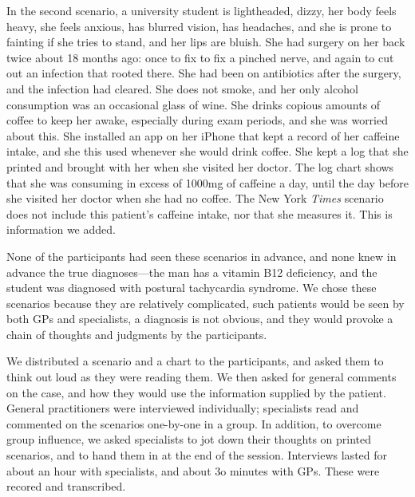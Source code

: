 \documentclass{sigchi}
\begin{document}
In the second scenario, a university student is lightheaded, dizzy, her body feels heavy, she feels anxious, has blurred vision, has headaches, and she is prone to fainting if she tries to stand, and her lips are bluish. She had surgery on her back twice about 18 months ago: once to fix to fix a pinched nerve, and again to cut out an infection that rooted there.  She had been on antibiotics after the surgery, and the infection had cleared.  She does not smoke, and her only alcohol consumption was an occasional glass of wine.  She drinks copious amounts of coffee to keep her awake, especially during exam periods, and she was worried about this.  She installed an app on her iPhone that kept a record of her caffeine intake, and she this used whenever she would drink coffee. She kept a log that she printed and brought with her when she visited her doctor. The log chart shows that she was consuming in excess of 1000mg of caffeine a day, until the day before she visited her doctor when she had no coffee.  The New York \emph{Times} scenario does not include this patient's caffeine intake, nor that she measures it.  This is information we added.

None of the participants had seen these scenarios in advance, and none knew in advance the true diagnoses—the man has a vitamin B12 deficiency, and the student was diagnosed with postural tachycardia syndrome.  We chose these scenarios because they are relatively complicated, such patients would be seen by both GPs and specialists, a diagnosis is not obvious, and they would provoke a chain of thoughts and judgments by the participants.

We distributed a scenario and a chart to the participants, and asked them to think out loud as they were reading them.  We then asked for general comments on the case, and how they would use the information supplied by the patient.  General practitioners were interviewed individually; specialists read and commented on the scenarios one-by-one in a group.  In addition, to overcome group influence, we asked specialists to jot down their thoughts on printed scenarios, and to hand them in at the end of the session.  Interviews lasted for about an hour with specialists, and about 3o minutes with GPs.  These were recored and transcribed.
\end{document}
